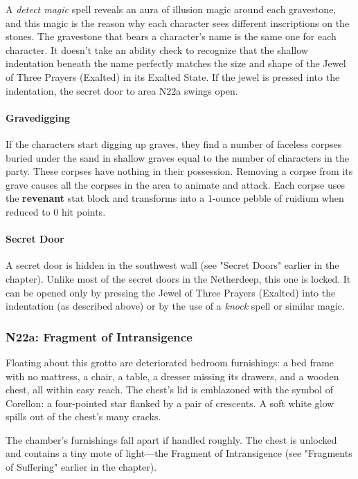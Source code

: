 \documentclass[10pt,a4,twoside,twocolumn,openany,nodeprecatedcode]{dndbook}
\begin{document}
A \textit{detect magic} spell reveals an aura of illusion magic around each gravestone, and this magic is the reason why each character sees different inscriptions on the stones. The gravestone that bears a character's name is the same one for each character. It doesn't take an ability check to recognize that the shallow indentation beneath the name perfectly matches the size and shape of the Jewel of Three Prayers (Exalted) in its Exalted State. If the jewel is pressed into the indentation, the secret door to area N22a swings open.
\paragraph{Gravedigging}
If the characters start digging up graves, they find a number of faceless corpses buried under the sand in shallow graves equal to the number of characters in the party. These corpses have nothing in their possession. Removing a corpse from its grave causes all the corpses in the area to animate and attack. Each corpse uses the \textbf{revenant} stat block and transforms into a 1-ounce pebble of ruidium when reduced to 0 hit points.
\paragraph{Secret Door}
A secret door is hidden in the southwest wall (see "Secret Doors" earlier in the chapter). Unlike most of the secret doors in the Netherdeep, this one is locked. It can be opened only by pressing the Jewel of Three Prayers (Exalted) into the indentation (as described above) or by the use of a \textit{knock} spell or similar magic.
\subsubsection{N22a: Fragment of Intransigence}
\begin{DndReadAloud}{}
Floating about this grotto are deteriorated bedroom furnishings: a bed frame with no mattress, a chair, a table, a dresser missing its drawers, and a wooden chest, all within easy reach. The chest's lid is emblazoned with the symbol of Corellon: a four-pointed star flanked by a pair of crescents. A soft white glow spills out of the chest's many cracks.
\end{DndReadAloud}

The chamber's furnishings fall apart if handled roughly. The chest is unlocked and contains a tiny mote of light—the Fragment of Intransigence (see "Fragments of Suffering" earlier in the chapter).
\end{document}

